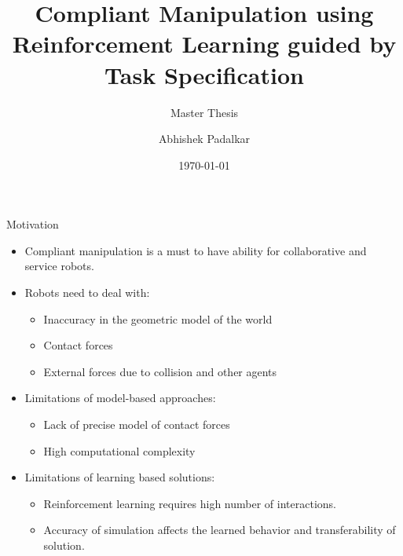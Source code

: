 \documentclass[aspectratio=169]{beamer}
\title{Compliant Manipulation using Reinforcement Learning guided by Task Specification}
\subtitle{Master Thesis}
\author{Abhishek Padalkar}
\institute[HBRS]{Hochschule Bonn-Rhein-Sieg}
\date{\today}
\begin{document}
{
\begin{frame}
\titlepage
\end{frame}
}

\begin{frame}{Motivation}
	\begin{itemize}
		\item Compliant manipulation is a must to have ability for collaborative and service robots.
		\item Robots need to deal with:
		\begin{itemize}
			\item Inaccuracy in the geometric model of the world
			\item Contact forces
			\item External forces due to collision and other agents
		\end{itemize}
		
		
		\item Limitations of model-based approaches:
		\begin{itemize}
			\item Lack of precise model of contact forces
			\item High computational complexity 	
		\end{itemize} 
		
		\item Limitations of learning based solutions:
		\begin{itemize}
			\item Reinforcement learning requires high number of interactions.
			
			\item Accuracy of simulation affects the learned behavior and transferability of solution.
				
		\end{itemize}
		\end{itemize}
\end{frame}
\end{document}

